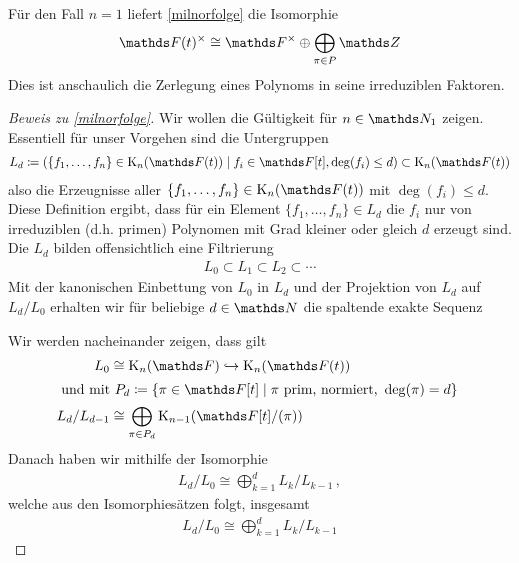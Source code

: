 \documentclass[ngerman,fontsize=11pt, paper=a4, parskip=half, titlepage=true, toc=bib]{scrartcl}
\begin{document}
\begin{Bem}
  Für den Fall $n=1$ liefert \ref{milnorfolge} die Isomorphie
  \begin{gather*}
    \Ft^\times
    \cong \Fx
    \oplus\bigoplus_{\pi\in P}\Z
    \end{gather*}
    Dies ist anschaulich die Zerlegung eines
    Polynoms in seine irreduziblen Faktoren.
\end{Bem}
\begin{proof}[Beweis zu \ref{milnorfolge}]
  Wir wollen die Gültigkeit für $n\in\N_1$ zeigen.
  Essentiell für unser Vorgehen sind die Untergruppen
  \begin{gather*}
    L_d\coloneqq \left(
      \{f_1,\dotsc,f_n\}\in\KnFt 
      \mid f_i\in\F[t],\deg(f_i)\leq d
      \right)
    \subset\KnFt
  \end{gather*}
  also die Erzeugnisse aller $\{f_1,\dotsc,f_n\}\in\KnFt$ mit
  $\deg(f_i)\leq d$. Diese Definition ergibt, dass für ein 
  Element $\{f_1,\dotsc,f_n\}\in L_d$ die $f_i$ nur von 
  irreduziblen (d.h. primen) Polynomen mit
  Grad kleiner oder gleich $d$ erzeugt sind.
  Die $L_d$ bilden offensichtlich eine Filtrierung
  \begin{gather*}
    L_0\subset L_1\subset L_2\subset \dotsb
  \end{gather*}
  Mit der kanonischen Einbettung von $L_0$ in $L_d$ und der Projektion
  von $L_d$ auf $L_d/L_0$ erhalten wir für
  beliebige $d\in\N$ die spaltende exakte Sequenz
  \begin{center}
  \end{center}
  Wir werden nacheinander zeigen, dass gilt
  \begin{align}
    L_0&\cong \KnF\hookrightarrow \KnFt  \label{1}\\
    \intertext{
    und mit $P_d\coloneqq \left\{
    \pi\in \F[t]\mid \pi\text{ prim, normiert, }\deg(\pi)=d
    \right\}$
    }
    L_d/L_{d-1}&\cong \bigoplus_{\pi\in P_d} \K_{n-1}(\Ftpi)\label{2}
  \end{align}
  Danach haben wir mithilfe der Isomorphie
  \begin{gather} \label{3}
    L_d/L_0\cong \bigoplus_{k=1}^d L_k/L_{k-1} \,,
  \end{gather}
  welche aus den Isomorphiesätzen folgt, insgesamt
  \begin{align}\label{4}
    L_d/L_0
    \cong \bigoplus_{k=1}^d L_k/L_{k-1}

\end{align}
\end{proof}
\end{document}
